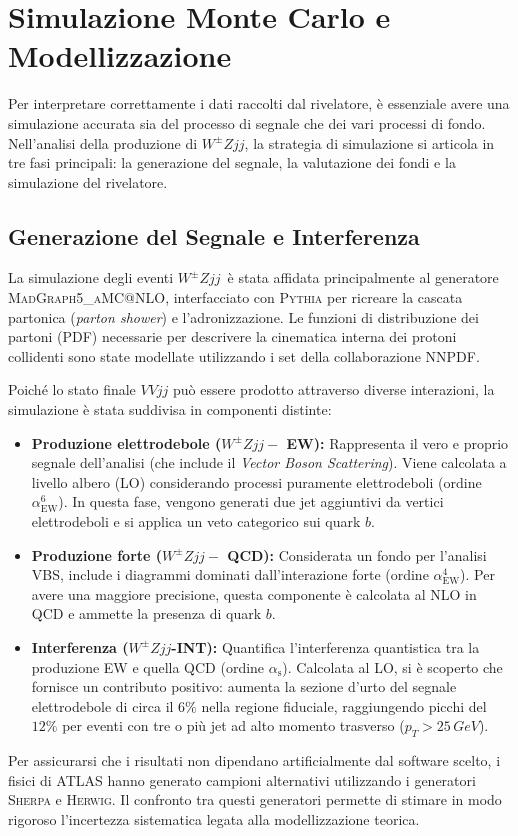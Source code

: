 \documentclass[11pt]{article}
\newcommand{\wzjjew}{$W^\pm Z jj-$ EW}
\newcommand{\wzjjqcd}{$W^\pm Z jj-$ QCD}
\newcommand{\wzjj}{$W^\pm Z jj$}
\begin{document}
\section{Simulazione Monte Carlo e Modellizzazione}

Per interpretare correttamente i dati raccolti dal rivelatore, è essenziale avere una simulazione accurata sia del processo di segnale che dei vari processi di fondo. Nell'analisi della produzione di \wzjj, la strategia di simulazione si articola in tre fasi principali: la generazione del segnale, la valutazione dei fondi e la simulazione del rivelatore.
\subsection{Generazione del Segnale e Interferenza}
La simulazione degli eventi \wzjj\ è stata affidata principalmente al generatore \textsc{MadGraph5\_aMC@NLO}, interfacciato con \textsc{Pythia} per ricreare la cascata partonica (\textit{parton shower}) e l'adronizzazione. Le funzioni di distribuzione dei partoni (PDF) necessarie per descrivere la cinematica interna dei protoni collidenti sono state modellate utilizzando i set della collaborazione \textsc{NNPDF}. 

Poiché lo stato finale $VVjj$ può essere prodotto attraverso diverse interazioni, la simulazione è stata suddivisa in componenti distinte:
\begin{itemize}
    \item \textbf{Produzione elettrodebole (\wzjjew):} Rappresenta il vero e proprio segnale dell'analisi (che include il \textit{Vector Boson Scattering}). Viene calcolata a livello albero (LO) considerando processi puramente elettrodeboli (ordine $\alpha_{\mathrm{EW}}^6$). In questa fase, vengono generati due jet aggiuntivi da vertici elettrodeboli e si applica un veto categorico sui quark $b$.
    \item \textbf{Produzione forte (\wzjjqcd):} Considerata un fondo per l'analisi VBS, include i diagrammi dominati dall'interazione forte (ordine $\alpha_{\mathrm{EW}}^4$). Per avere una maggiore precisione, questa componente è calcolata al NLO in QCD e ammette la presenza di quark $b$.
    \item \textbf{Interferenza (\wzjj-INT):} Quantifica l'interferenza quantistica tra la produzione EW e quella QCD (ordine $\alpha_{\mathrm{s}}$). Calcolata al LO, si è scoperto che fornisce un contributo positivo: aumenta la sezione d'urto del segnale elettrodebole di circa il $6\%$ nella regione fiduciale, raggiungendo picchi del $12\%$ per eventi con tre o più jet ad alto momento trasverso ($p_T > 25\,\unit{GeV}$).
\end{itemize}
Per assicurarsi che i risultati non dipendano artificialmente dal software scelto, i fisici di ATLAS hanno generato campioni alternativi utilizzando i generatori \textsc{Sherpa} e \textsc{Herwig}. Il confronto tra questi generatori permette di stimare in modo rigoroso l'incertezza sistematica legata alla modellizzazione teorica.
\end{document}
